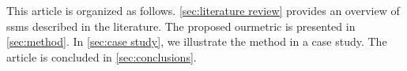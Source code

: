 This article is organized as follows.
\cref{sec:literature review} provides an overview of \acp{ssm} described in the literature.
The proposed \ac{ourmetric} is presented in \cref{sec:method}.
In \cref{sec:case study}, we illustrate the method in a case study.
The article is concluded in \cref{sec:conclusions}.
